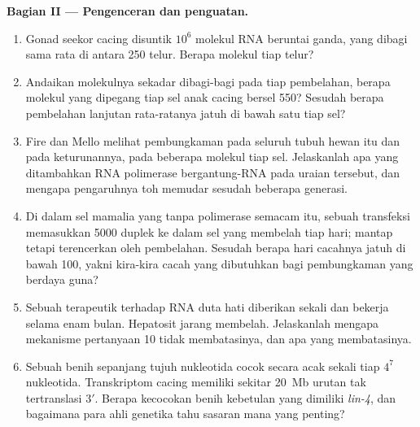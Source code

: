 \begin{problem}
\medskip
\noindent\textbf{Bagian II --- Pengenceran dan penguatan.}
\begin{enumerate}[resume]
  \item Gonad seekor cacing disuntik $10^{6}$ molekul RNA
        beruntai ganda, yang dibagi sama rata di antara \num{250}
        telur. Berapa molekul tiap telur?
  \item Andaikan molekulnya sekadar dibagi-bagi pada tiap pembelahan,
        berapa molekul yang dipegang tiap sel anak cacing bersel \num{550}?
        Sesudah berapa pembelahan lanjutan rata-ratanya jatuh di bawah
        satu tiap sel?
  \item Fire dan Mello melihat pembungkaman pada seluruh tubuh hewan itu
        dan pada keturunannya, pada beberapa molekul tiap sel. Jelaskanlah
        apa yang ditambahkan RNA polimerase bergantung-RNA pada uraian
        tersebut, dan mengapa pengaruhnya toh memudar sesudah beberapa
        generasi.
  \item Di dalam sel mamalia yang tanpa polimerase semacam itu, sebuah
        transfeksi  memasukkan \num{5000} duplek ke dalam sel yang
        membelah tiap hari;  mantap tetapi terencerkan oleh
        pembelahan. Sesudah berapa hari cacahnya jatuh di bawah \num{100},
        yakni kira-kira cacah yang dibutuhkan bagi pembungkaman yang
        berdaya guna?
  \item Sebuah  terapeutik terhadap RNA duta hati diberikan sekali
        dan bekerja selama enam bulan. Hepatosit jarang membelah.
        Jelaskanlah mengapa mekanisme pertanyaan 10 tidak membatasinya, dan
        apa yang membatasinya.
  \item Sebuah benih sepanjang tujuh nukleotida cocok secara acak sekali
        tiap $4^{7}$ nukleotida. Transkriptom cacing memiliki sekitar
        \qty{20}{Mb} urutan tak tertranslasi 3$'$. Berapa kecocokan benih
        kebetulan yang dimiliki \emph{lin-4}, dan bagaimana para ahli
        genetika tahu sasaran mana yang penting?
\end{enumerate}


\end{problem}
